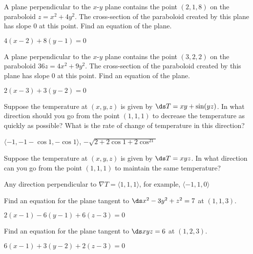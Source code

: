 \begin{enumialphparenastyle}
\begin{ex}
A plane perpendicular to the $x$-$y$ plane contains the
point $(2,1,8)$ on the paraboloid $z=x^2+4y^2$. The cross-section of
the paraboloid created by this plane has slope 0 at this point. Find
an equation of the plane.
\begin{sol}
$4(x-2)+8(y-1)=0$
\end{sol}
\end{ex}

\begin{ex}
A plane perpendicular to the $x$-$y$ plane contains the
point $(3,2,2)$ on the paraboloid $36z=4x^2+9y^2$. The cross-section
of the paraboloid created by this plane has slope 0 at this point.
Find an equation of the plane.
\begin{sol}
$2(x-3)+3(y-2)=0$
\end{sol}
\end{ex}

\begin{ex}
Suppose the temperature at $(x,y,z)$ is given by 
$\ds T=xy+\sin(yz)$. In what direction should you go from the point 
$(1,1,1)$ to decrease the temperature as quickly as possible? What is
the rate of change of temperature in this direction?
\begin{sol}
$\langle -1,-1-\cos1,-\cos1\rangle$, $-\sqrt{2+2\cos1+2\cos^21}$
\end{sol}
\end{ex}

\begin{ex}
Suppose the temperature at $(x,y,z)$ is given by 
$\ds T=xyz$. In what direction can you go from the point 
$(1,1,1)$ to maintain the same temperature?
\begin{sol}
Any direction perpendicular to $\nabla T=\langle
1,1,1\rangle$,
for example, $\langle -1,1,0\rangle$
\end{sol}
\end{ex}

\begin{ex}
Find an equation for the plane tangent to 
$\ds x^2-3y^2+z^2=7$ at $(1,1,3)$.
\begin{sol}
$2(x-1)-6(y-1)+6(z-3)=0$
\end{sol}
\end{ex}

\begin{ex}
Find an equation for the plane tangent to 
$\ds xyz=6$ at $(1,2,3)$.
\begin{sol}
$6(x-1)+3(y-2)+2(z-3)=0$
\end{sol}
\end{ex}


\end{enumialphparenastyle}
